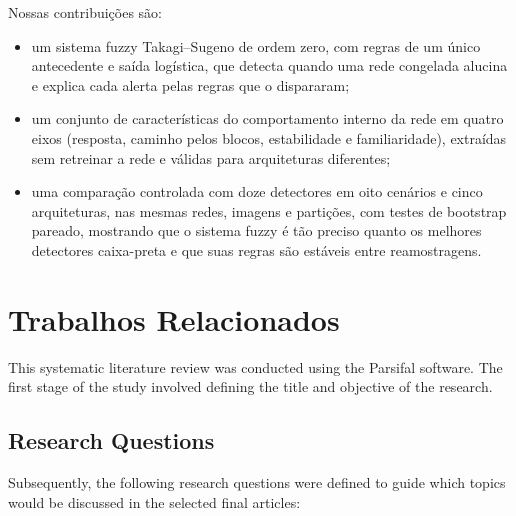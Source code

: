 Nossas contribuições são:
\begin{itemize}
  \item um sistema fuzzy Takagi--Sugeno de ordem zero, com regras de um único antecedente e saída logística, que detecta quando uma rede
        congelada alucina e explica cada alerta pelas regras que o dispararam;
  \item um conjunto de características do comportamento interno da rede em quatro eixos (resposta, caminho pelos blocos, estabilidade e
        familiaridade), extraídas sem retreinar a rede e válidas para arquiteturas diferentes;
  \item uma comparação controlada com doze detectores em oito cenários e cinco arquiteturas, nas mesmas redes, imagens e partições, com
        testes de bootstrap pareado, mostrando que o sistema fuzzy é tão preciso quanto os melhores detectores caixa-preta e que suas regras
        são estáveis entre reamostragens.
\end{itemize}

\section{Trabalhos Relacionados}


This systematic literature review was conducted using the Parsifal software. The first stage of the study involved defining the title and
objective of the research.

\subsection{Research Questions}

Subsequently, the following research questions were defined to guide which topics would be discussed in the selected final articles:

